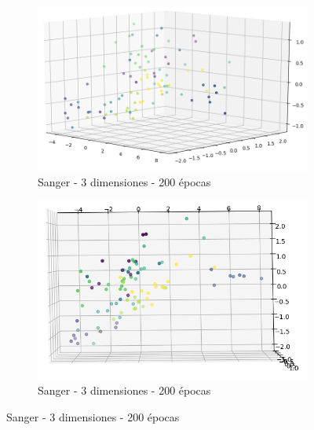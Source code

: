 \begin{figure}[!htbp]
\centering
\begin{subfigure}{.5\textwidth}
  \centering
  \includegraphics[width=1\linewidth, scale=1]{../img/ej1/sanger/sanger_3salida_100ep_validation.png}
  \caption{Sanger - 3 dimensiones - 200 épocas}
  \label{fig:sub1}
\end{subfigure}%
\begin{subfigure}{.5\textwidth}
  \centering
  \includegraphics[width=1\linewidth, scale=1]{../img/ej1/sanger/sanger_3salida_100ep_validation_3.png}
  \caption{Sanger - 3 dimensiones - 200 épocas}
  \label{fig:sub2}
\end{subfigure}
\end{figure}

